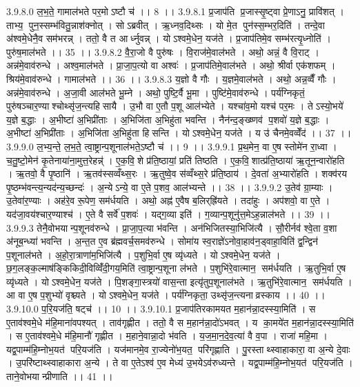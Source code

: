 3.9.8.0
ल॒भ॒ते॒ गामाल॑भते पर॒मोऽष्टौ च॑ ।। 8 ।।
3.9.8.1
प्र॒जाप॑ति प्र॒जास्सृ॒ष्ट्वा प्रे॒णाऽनु॒ प्रावि॑शत् । ताभ्य॒ पुन॒स्सम्भ॑वितु॒न्नाश॑क्नोत् । सोऽब्रवीत् । ऋ॒ध्नव॒दिथ्सः । यो मे॒त पुन॑स्स॒म्भर॒दिति॑ । तन्दे॒वा अ॑श्वमे॒धेनै॒व सम॑भरन्न् । ततो॒ वै त आर्ध्नुवन्न् । योऽश्वमे॒धेन॒ यज॑ते । प्र॒जाप॑तिमे॒व सम्भ॑रत्यृ॒ध्नोति॑ । पुरु॑ष॒माल॑भते ।। 35 ।।
3.9.8.2
वै॒रा॒जो वै पुरु॑षः । वि॒राज॑मे॒वाल॑भते । अथो॒ अन्नं॒ वै वि॒राट् । अन्न॑मे॒वाव॑रुन्धे । अश्व॒माल॑भते । प्रा॒जा॒प॒त्यो वा अश्वः॑ । प्र॒जाप॑तिमे॒वाल॑भते । अथो॒ श्रीर्वा एक॑शफम् । श्रिय॑मे॒वाव॑रुन्धे । गामाल॑भते ।। 36 ।।
3.9.8.3
य॒ज्ञो वै गौः । य॒ज्ञमे॒वाल॑भते । अथो॒ अन्न॒व्वैँ गौः । अन्न॑मे॒वाव॑रुन्धे । अ॒जा॒वी आल॑भते भू॒म्ने । अथो॒ पुष्टि॒र्वै भू॒मा । पुष्टि॑मे॒वाव॑रुन्धे । पर्य॑ग्निकृतं॒ पुरु॑षञ्चार॒ण्याश्चोथ्सृ॑ज॒न्त्यहि॑सायै । उ॒भौ वा ए॒तौ प॒शू आल॑भ्येते । यश्चा॑व॒मो यश्च॑ पर॒मः । तेऽस्यो॒भये॑ य॒ज्ञे ब॒द्धाः । अ॒भीष्टा॑ अ॒भिप्री॑ताः । अ॒भिजि॑ता अ॒भिहु॑ता भवन्ति । नैन॑न्द॒ङ्ख्ष्णव॑ प॒शवो॑ य॒ज्ञे ब॒द्धाः । अ॒भीष्टा॑ अ॒भिप्री॑ताः । अ॒भिजि॑ता अ॒भिहु॑ता हिसन्ति । योऽश्वमे॒धेन॒ यज॑ते । य उ॑ चैनमे॒वव्वेँद॑ ।। 37 ।।
3.9.9.0
ल॒भ्य॒न्ते॒ ल॒भ॒ते॒ त्वा॒ष्ट्रान्प॒शूनाल॑भते॒ऽष्टौ च॑ ।। 9 ।।
3.9.9.1
प्र॒थ॒मेन॒ वा ए॒ष स्तोमे॑न रा॒ध्वा । च॒तु॒ष्टो॒मेन॑ कृ॒तेनाया॑ना॒मुत्त॒रेहन्न्॑ । ए॒क॒वि॒॒शे प्र॑ति॒ष्ठायां॒ प्रति॑ तिष्ठति । ए॒क॒वि॒॒शात्प्र॑ति॒ष्ठाया॑ ऋ॒तून॒न्वारो॑हति । ऋ॒तवो॒ वै पृ॒ष्ठानि॑ । ऋ॒तव॑स्सव्वँथ्स॒रः । ऋ॒तुष्वे॒व स॑व्वँथ्स॒रे प्र॑ति॒ष्ठाय॑ । दे॒वता॑ अ॒भ्यारो॑हति । शक्व॑रय पृ॒ष्ठम्भ॑वन्त्य॒न्यद॑न्य॒च्छन्दः॑ । अ॒न्येऽन्ये॒ वा ए॒ते प॒शव॒ आल॑भ्यन्ते ।। 38 ।।
3.9.9.2
उ॒तेव॑ ग्रा॒म्याः । उ॒तेवा॑र॒ण्याः । अह॑रे॒व रू॒पेण॒ सम॑र्धयति । अथो॒ अह्न॑ ए॒वैष ब॒लिर्‌ह्रि॑यते । तदा॑हुः । अप॑शवो॒ वा ए॒ते । यद॑जा॒वय॑श्चार॒ण्याश्च॑ । ए॒ते वै सर्वे॑ प॒शवः॑ । यद्ग॒व्या इति॑ । ग॒व्यान्प॒शूनु॑त्त॒मेऽह॒न्नाल॑भते ।। 39 ।।
3.9.9.3
तेनै॒वोभयान्प॒शूनव॑रुन्धे । प्रा॒जा॒प॒त्या भ॑वन्ति । अन॑भिजितस्या॒भिजि॑त्यै । सौ॒रीर्नव॑ श्वे॒ता व॒शा अ॑नूब॒न्ध्या॑ भवन्ति । अ॒न्त॒त ए॒व ब्र॑ह्मवर्च॒समव॑रुन्धे । सोमा॑य स्व॒राज्ञे॑ऽनोवा॒हाव॑न॒ड्वाहा॒विति॑ द्व॒न्द्विन॑ प॒शूनाल॑भते । अ॒हो॒रा॒त्राणा॑म॒भिजि॑त्यै । प॒शुभि॒र्वा ए॒ष व्यृ॑ध्यते । योऽश्वमे॒धेन॒ यज॑ते । छ॒ग॒लङ्क॒ल्माष॑ङ्किकिदी॒विव्विँ॑दी॒गय॒मिति॑ त्वा॒ष्ट्रान्प॒शूना ल॑भते । प॒शुभि॑रे॒वात्मान॒॒ सम॑र्धयति । ऋ॒तुभि॒र्वा ए॒ष व्यृ॑ध्यते । योऽश्वमे॒धेन॒ यज॑ते । पि॒शङ्गा॒स्त्रयो॑ वास॒न्ता इत्यृ॑तुप॒शूनाल॑भते । ऋ॒तुभि॑रे॒वात्मान॒॒ सम॑र्धयति । आ वा ए॒ष प॒शुभ्यो॑ वृश्च्यते । योऽश्वमे॒धेन॒ यज॑ते । पर्य॑ग्निकृता॒ उथ्सृ॑ज॒न्त्यनाव्रस्काय ।। 40 ।।
3.9.10.0
प॒रि॒यज॑ति॒ षट्च॑ ।। 10 ।।
3.9.10.1
प्र॒जाप॑तिरकामयत म॒हान॑न्ना॒दस्स्या॒मिति॑ । स ए॒ताव॑श्वमे॒धे म॑हि॒माना॑वपश्यत् । ताव॑गृह्णीत । ततो॒ वै स म॒हान॑न्ना॒दो॑ऽभवत् । य का॒मये॑त म॒हान॑न्ना॒दस्स्या॒मिति॑ । स ए॒ताव॑श्वमे॒धे म॑हि॒मानौ॑ गृह्णीत । म॒हाने॒वान्ना॒दो भ॑वति । य॒ज॒मा॒न॒दे॒व॒त्या॑ वै व॒पा । राजा॑ महि॒मा । यद्व॒पाम्म॑हि॒म्नोभ॒यत॑ परि॒यज॑ति । यज॑मानमे॒व रा॒ज्येनो॑भ॒यत॒ परि॑गृह्णाति । पु॒रस्ताथ्स्वाहाकारा॒ वा अ॒न्ये दे॒वाः । उ॒परि॑ष्टाथ्स्वाहाकारा अ॒न्ये । ते वा ए॒तेऽश्व॑ ए॒व मेध्य॑ उ॒भयेऽव॑रुध्यन्ते । यद्व॒पाम्म॑हि॒म्नोभ॒यत॑ परि॒यज॑ति । ताने॒वोभयान्प्रीणाति ।। 41 ।।
